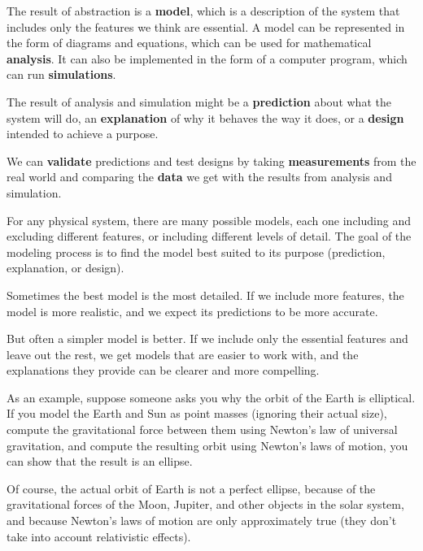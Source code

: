 \documentclass[12pt]{book}
\theoremstyle{exercise}
\begin{document}

The result of abstraction is a {\bf model}, which is a description of the system that includes only the features we think are essential.  A model can be represented in the form of diagrams and equations, which can be used for mathematical {\bf analysis}.  It can also be implemented in the form of a computer program, which can run {\bf simulations}.


The result of analysis and simulation might be a {\bf prediction} about what the system will do, an {\bf explanation} of why it behaves the way it does, or a {\bf design} intended to achieve a purpose.


We can {\bf validate} predictions and test designs by taking {\bf measurements} from the real world and comparing the {\bf data} we get with the results from analysis and simulation. 


For any physical system, there are many possible models, each one including and excluding different features, or including different levels of detail.  The goal of the modeling process is to find the model best suited to its purpose (prediction, explanation, or design).


Sometimes the best model is the most detailed.  If we include more features, the model is more realistic, and we expect its predictions to be more accurate.


But often a simpler model is better.  If we include only the essential features and leave out the rest, we get models that are easier to work with, and the explanations they provide can be clearer and more compelling.


As an example, suppose someone asks you why the orbit of the Earth is elliptical.  If you model the Earth and Sun as point masses (ignoring their actual size), compute the gravitational force between them using Newton's law of universal gravitation, and compute the resulting orbit using Newton's laws of motion, you can show that the result is an ellipse.


Of course, the actual orbit of Earth is not a perfect ellipse, because of the gravitational forces of the Moon, Jupiter, and other objects in the solar system, and because Newton's laws of motion are only approximately true (they don't take into account relativistic effects).
\end{document}
